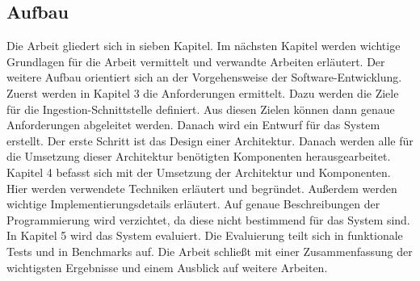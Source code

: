 \subsection{Aufbau}
Die Arbeit gliedert sich in sieben Kapitel.
Im nächsten Kapitel werden wichtige Grundlagen für die Arbeit vermittelt und verwandte Arbeiten erläutert. 
Der weitere Aufbau orientiert sich an der Vorgehensweise der Software-Entwicklung.
Zuerst werden in Kapitel 3 die Anforderungen ermittelt.
Dazu werden die Ziele für die Ingestion-Schnittstelle definiert.
Aus diesen Zielen können dann genaue Anforderungen abgeleitet werden.
Danach wird ein Entwurf für das System erstellt.
Der erste Schritt ist das Design einer Architektur.
Danach werden alle für die Umsetzung dieser Architektur benötigten Komponenten herausgearbeitet.
Kapitel 4 befasst sich mit der Umsetzung der Architektur und Komponenten.
Hier werden verwendete Techniken erläutert und begründet.
Außerdem werden wichtige Implementierungsdetails erläutert.
Auf genaue Beschreibungen der Programmierung wird verzichtet, da diese nicht bestimmend für das System sind.
In Kapitel 5 wird das System evaluiert.
Die Evaluierung teilt sich in funktionale Tests und in Benchmarks auf.
Die Arbeit schließt mit einer Zusammenfassung der wichtigsten Ergebnisse und einem Ausblick auf weitere Arbeiten.